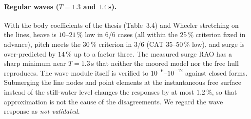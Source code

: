 \documentclass[11pt,a4paper]{article}
\begin{document}
\paragraph{Regular waves ($T=1.3$ and $1.4$\,s).} With the body coefficients of the thesis (Table~3.4) and Wheeler stretching on the lines, heave is $10$--$21\,\%$ low in 6/6 cases (all within the 25\,\% criterion fixed in advance), pitch meets the 30\,\% criterion in 3/6 (CAT $35$--$50\,\%$ low), and surge is over-predicted by $14\,\%$ up to a factor three. The measured surge RAO has a sharp minimum near $T=1.3$\,s that neither the moored model nor the free hull reproduces. The wave module itself is verified to $10^{-6}$--$10^{-12}$ against closed forms. Submerging the line nodes and point elements at the instantaneous free surface instead of the still-water level changes the responses by at most $1.2\,\%$, so that approximation is not the cause of the disagreements. We regard the wave response as \emph{not validated}.
\end{document}
